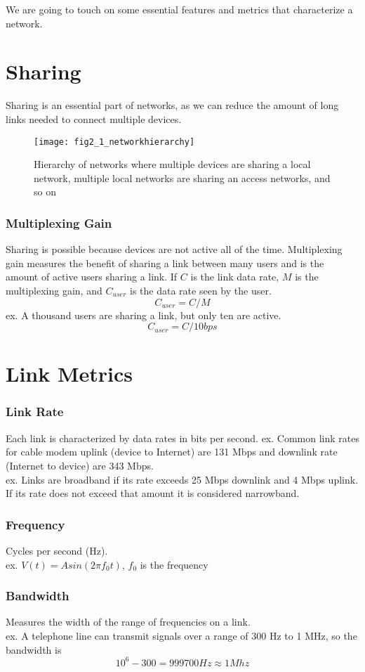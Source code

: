 We are going to touch on some essential features and metrics that characterize a network.

\section{Sharing}
Sharing is an essential part of networks, as we can reduce the amount of long links needed to connect multiple devices. 
\begin{figure}[!htbp]
    \centering
    \texttt{[image: fig2\_1\_networkhierarchy]}
    \caption{Hierarchy of networks where multiple devices are sharing a local network, multiple local networks are sharing an access networks, and so on}
    \label{fig:Network_Hierarchy}
\end{figure}
\subsubsection*{Multiplexing Gain}
Sharing is possible because devices are not active all of the time. Multiplexing gain measures the benefit of sharing a link between many users and is the amount of active users sharing a link. If $C$ is the link data rate, $M$ is the multiplexing gain, and $C_{user}$ is the data rate seen by the user.
$$ C_{user} = C/M $$
ex. A thousand users are sharing a link, but only ten are active.
$$ C_{user} = C/10 bps$$

\section{Link Metrics}
\subsubsection*{Link Rate}
Each link is characterized by data rates in bits per second.
ex. Common link rates for cable modem uplink (device to Internet) are 131 Mbps and downlink rate (Internet to device) are 343 Mbps. \\
ex. Links are broadband if its rate exceeds 25 Mbps
downlink and 4 Mbps uplink. If its rate does not exceed that amount it is considered narrowband.
\subsubsection*{Frequency}
Cycles per second (Hz). \\
ex. $V(t) = A sin(2 \pi f_0 t)$, $f_0$ is the frequency
\subsubsection*{Bandwidth}
Measures the width of the range of frequencies on a link.\\
ex. A telephone line can transmit signals over a range of 300 Hz to 1 MHz, so the bandwidth is $$10^6 - 300 = 999700 Hz \approx 1 Mhz$$
